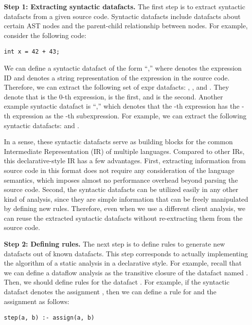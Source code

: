 \medskip
\textbf{Step 1: Extracting syntactic datafacts.}
The first step is to extract syntactic datafacts from a given source code.
Syntactic datafacts include datafacts about certain AST nodes and
the parent-child relationship between nodes. For example, consider
the following code:

\begin{lstlisting}[style=cpp,xleftmargin=2.5em]
int x = 42 + 43;
\end{lstlisting}
We can define a syntactic datafact of the form ``,''
where  denotes the expression ID and 
denotes a string representation of the expression in the source code.
Therefore, we can extract the following set of expr datafacts:
, , and .
They denote that  is the 0-th expression,
 is the first, and  is the second.
Another example syntactic datafact is ``,''
which denotes that the -th expression has the -th
expression as the -th subexpression.
For example, we can extract the following syntactic datafacts:
 and .

In a sense, these syntactic datafacts serve as building blocks for the
common Intermediate Representation (IR) of multiple languages.
Compared to other IRs, this declarative-style IR has a few advantages.
First, extracting information from source code in this format does not
require any consideration of the language semantics, which imposes
almost no performance overhead beyond parsing the source code.
Second, the syntactic datafacts can be utilized easily in any other kind of
analysis, since they are simple information that can be freely
manipulated by defining new rules. Therefore, even when we use a different
client analysis, we can reuse the extracted syntactic datafacts
without re-extracting them from the source code.


\medskip
\textbf{Step 2: Defining rules.}
The next step is to define rules to generate new datafacts out of known datafacts.
This step corresponds to actually implementing the algorithm of a
static analysis in a declarative style.
For example, recall that we can define a dataflow analysis
 as the transitive closure of the datafact
named .
Then, we should define rules for the datafact .
For example, if the syntactic datafact 
denotes the assignment , then we can define a rule for
 and the assignment as follows:
\begin{lstlisting}[style=myDatalog,xleftmargin=2.5em]
step(a, b) :- assign(a, b)
\end{lstlisting}


